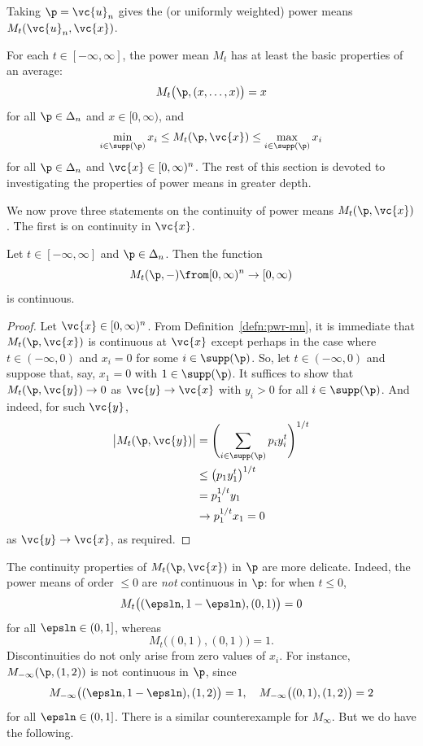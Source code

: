 \begin{example}
Taking $\p = \vc{u}_n$ gives the %
%
%
%
(or uniformly weighted) power means $M_t(\vc{u}_n, \vc{x})$.
\end{example}

\begin{example}
For each $t \in [-\infty, \infty]$, the power mean $M_t$ has at least the
basic properties of an average:
\[
M_t\bigl(\p, (x, \ldots, x)\bigr) = x
\]
for all $\p \in \Delta_n$ and $x \in [0, \infty)$, and
\[
\min_{i \in \supp(\p)} x_i
\leq
M_t(\p, \vc{x})
\leq
\max_{i \in \supp(\p)} x_i
\]
for all $\p \in \Delta_n$ and $\vc{x} \in [0, \infty)^n$.  The rest of this
section is devoted to investigating the properties of power means in
greater depth.
\end{example}

We now prove three statements on the continuity of power means $M_t(\p,
\vc{x})$.  The first is on continuity in $\vc{x}$.

\begin{lemma}
% 
Let $t \in [-\infty, \infty]$ and $\p \in \Delta_n$.  Then the function
\[
M_t(\p, -) \from [0, \infty)^n \to [0, \infty)
\]
is continuous.
\end{lemma}

\begin{proof}
Let $\vc{x} \in [0, \infty)^n$.  From Definition~\ref{defn:pwr-mn}, it is
immediate that $M_t(\p, \vc{x})$ is continuous at $\vc{x}$ except perhaps
in the case where $t \in (-\infty, 0)$ and $x_i = 0$ for some $i \in
\supp(\p)$.  So, let $t \in (-\infty, 0)$ and suppose that, say, $x_1 =
0$ with $1 \in \supp(\p)$.  It suffices to show that $M_t(\p, \vc{y}) \to
0$ as $\vc{y} \to \vc{x}$ with $y_i > 0$ for all $i \in \supp(\p)$.  And
indeed, for such $\vc{y}$,
% 
\begin{align*}
\bigl| M_t(\p, \vc{y}) \bigr|   &
=
\Biggl( \sum_{i \in \supp(\p)} p_i y_i^t \Biggr)^{1/t}  \\
&
\leq
\bigl( p_1 y_1^t \bigr)^{1/t}   \\
&
=
p_1^{1/t} y_1   \\
&
\to 
p_1^{1/t} x_1
=
0
\end{align*}
% 
as $\vc{y} \to \vc{x}$, as required.
\end{proof}

The continuity properties of $M_t(\p, \vc{x})$ in $\p$ are more delicate.
Indeed, the power means of order $\leq 0$ are \emph{not} continuous in
$\p$: for when $t \leq 0$,
\[
M_t\bigl((\epsln, 1 - \epsln), (0, 1)\bigr) = 0
\]
for all $\epsln \in (0, 1]$, whereas
\[
M_t\bigl((0, 1), (0, 1)\bigr) = 1.
\]
Discontinuities do not only arise from zero values of $x_i$.  For
instance, $M_{-\infty}(\p, (1, 2))$ is not continuous in $\p$, since
\[
M_{-\infty}\bigl((\epsln, 1 - \epsln), (1, 2)\bigr) = 1,
\quad
M_{-\infty}\bigl((0, 1), (1, 2)\bigr) = 2
\]
for all $\epsln \in (0, 1]$.  There is a similar counterexample for
$M_\infty$.  But we do have the following.

